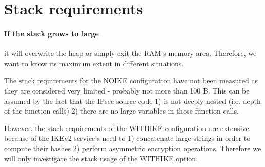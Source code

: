 \documentclass[final,a4paper,twoside,11pt,onecolumn]{report}
\begin{document}
% 


% 
% 
% 
% 



\section{Stack requirements}
\paragraph{If the stack grows to large} it will overwrite the heap or simply exit the RAM's memory area. Therefore, we want to know its maximum extent in different situations.

The stack requirements for the NOIKE configuration have not been measured as they are considered very limited - probably not more than 100 B. This can be assumed by the fact that the IPsec source code 1) is not deeply nested (i.e. depth of the function calls) 2) there are no large variables in those function calls. 


However, the stack requirements of the WITHIKE configuration are extensive because of the IKEv2 service's need to 1) concatenate large strings in order to compute their hashes 2) perform asymmetric encryption operations. Therefore we will only investigate the stack usage of the WITHIKE option.
\end{document}
